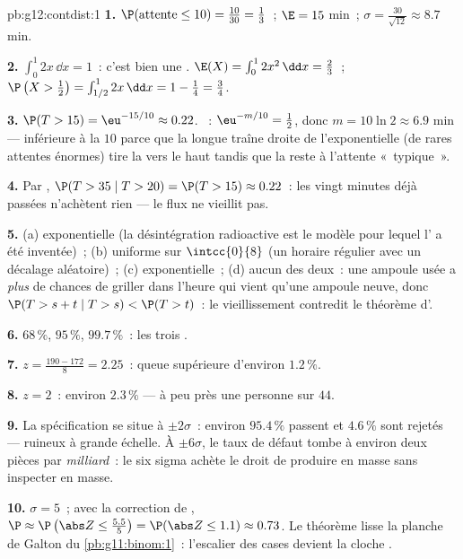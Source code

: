 \begin{solution}{pb:g12:contdist:1}
\textbf{1.} $\P(\text{attente} \leq 10) = \frac{10}{30} =
\frac13$~; $\E = 15$ min~;
$\sigma = \frac{30}{\sqrt{12}} \approx 8.7$ min.

\textbf{2.} $\int_0^1 2x\,\dd x = 1$~: c'est bien une .
$\E(X) = \int_0^1 2x^2\,\dd x = \frac23$~;
$\P\left(X > \frac12\right) = \int_{1/2}^1 2x\,\dd x =
1 - \frac14 = \frac34$.

\textbf{3.} $\P(T > 15) = \eu^{-15/10} \approx 0.22$. ~:
$\eu^{-m/10} = \frac12$, donc $m = 10\ln 2 \approx 6.9$ min ---
inférieure à la  $10$ parce que la longue traîne droite de
l'exponentielle (de rares attentes énormes) tire la  vers le
haut tandis que la  reste à l'attente «~typique~».

\textbf{4.} Par ,
$\P(T > 35 \mid T > 20) = \P(T > 15) \approx 0.22$~: les vingt
minutes déjà passées n'achètent rien --- le flux ne vieillit pas.

\textbf{5.} (a) exponentielle (la désintégration radioactive est le
modèle pour lequel l' a été inventée)~; (b)
uniforme sur $\intcc{0}{8}$ (un horaire régulier avec un décalage
aléatoire)~; (c) exponentielle~; (d) aucun des deux~: une ampoule
usée a \emph{plus} de chances de griller dans l'heure qui vient
qu'une ampoule neuve, donc
$\P(T > s + t \mid T > s) < \P(T > t)$~: le vieillissement
contredit le théorème d'.

\textbf{6.} $68\,\%$, $95\,\%$, $99.7\,\%$~: les trois 
.

\textbf{7.} $z = \frac{190 - 172}{8} = 2.25$~: queue supérieure
d'environ $1.2\,\%$.

\textbf{8.} $z = 2$~: environ $2.3\,\%$ --- à peu près une personne
sur $44$.

\textbf{9.} La spécification se situe à $\pm 2\sigma$~: environ
$95.4\,\%$ passent et $4.6\,\%$ sont rejetés --- ruineux à grande
échelle. À $\pm 6\sigma$, le taux de défaut tombe à environ deux
pièces par \emph{milliard}~: le six sigma achète le droit de
produire en masse sans inspecter en masse.

\textbf{10.} $\sigma = 5$~; avec la correction de ,
$\P \approx \P\left(\abs Z \leq \frac{5.5}{5}\right) =
\P(\abs Z \leq 1.1) \approx 0.73$. Le théorème lisse la planche de
Galton du \cref{pb:g11:binom:1}~: l'escalier des cases devient la
cloche .


\end{solution}
